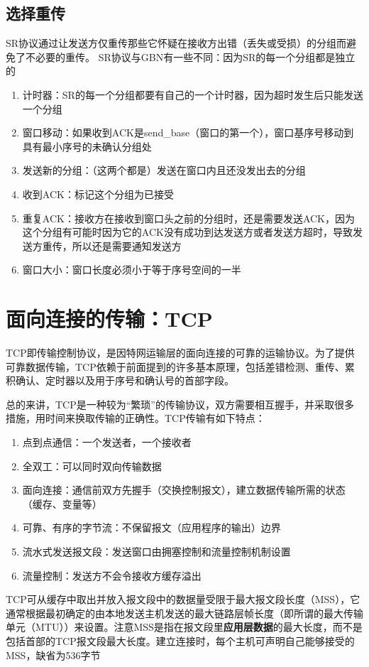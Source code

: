 \documentclass[]{report}
\begin{document}
		\subsection{选择重传}
			SR协议通过让发送方仅重传那些它怀疑在接收方出错（丢失或受损）的分组而避免了不必要的重传。
			SR协议与GBN有一些不同：因为SR的每一个分组都是独立的
			\begin{enumerate}
				\item 计时器：SR的每一个分组都要有自己的一个计时器，因为超时发生后只能发送一个分组
				\item 窗口移动：如果收到ACK是send\_base（窗口的第一个），窗口基序号移动到具有最小序号的未确认分组处
				\item 发送新的分组：（这两个都是）发送在窗口内且还没发出去的分组
				\item 收到ACK：标记这个分组为已接受
				\item 重复ACK：接收方在接收到窗口头之前的分组时，还是需要发送ACK，因为这个分组有可能时因为它的ACK没有成功到达发送方或者发送方超时，导致发送方重传，所以还是需要通知发送方
				\item 窗口大小：窗口长度必须小于等于序号空间的一半
			\end{enumerate}
	\section{面向连接的传输：TCP}
		TCP即传输控制协议，是因特网运输层的面向连接的可靠的运输协议。为了提供可靠数据传输，TCP依赖于前面提到的许多基本原理，包括差错检测、重传、累积确认、定时器以及用于序号和确认号的首部字段。\par
		总的来讲，TCP是一种较为“繁琐”的传输协议，双方需要相互握手，并采取很多措施，用时间来换取传输的正确性。TCP传输有如下特点：
		\begin{enumerate}
			\item 点到点通信：一个发送者，一个接收者
			\item 全双工：可以同时双向传输数据
			\item 面向连接：通信前双方先握手（交换控制报文），建立数据传输所需的状态（缓存、变量等）
			\item 可靠、有序的字节流：不保留报文（应用程序的输出）边界
			\item 流水式发送报文段：发送窗口由拥塞控制和流量控制机制设置
			\item 流量控制：发送方不会令接收方缓存溢出
		\end{enumerate}
		TCP可从缓存中取出并放入报文段中的数据量受限于最大报文段长度（MSS），它通常根据最初确定的由本地发送主机发送的最大链路层帧长度（即所谓的最大传输单元（MTU））来设置。注意MSS是指在报文段里\textbf{应用层数据}的最大长度，而不是包括首部的TCP报文段最大长度。建立连接时，每个主机可声明自己能够接受的MSS，缺省为536字节
\end{document}
